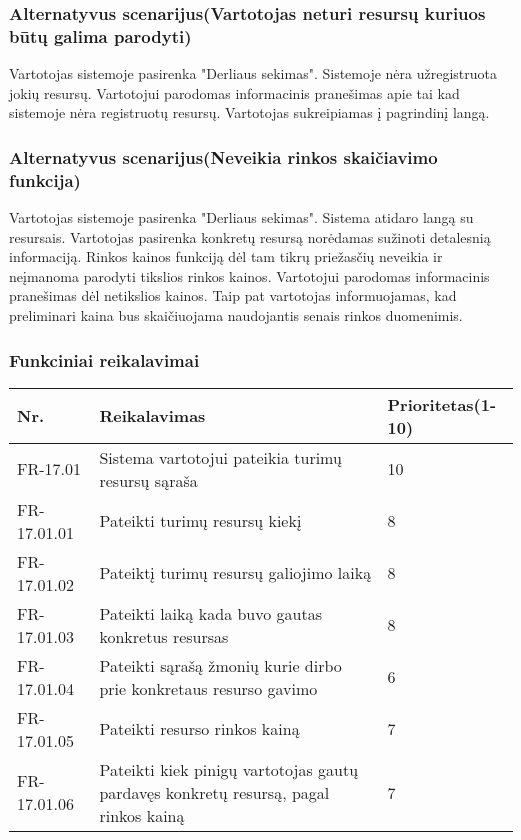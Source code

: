 \documentclass[oneside]{VUMIFPSkursinis}
\begin{document}
	\subsubsection{Alternatyvus scenarijus(Vartotojas neturi resursų kuriuos būtų galima parodyti)}
	Vartotojas sistemoje pasirenka "Derliaus  sekimas". Sistemoje nėra užregistruota jokių resursų. Vartotojui parodomas informacinis pranešimas apie tai kad sistemoje nėra registruotų resursų. Vartotojas sukreipiamas į pagrindinį langą.
	\subsubsection{Alternatyvus scenarijus(Neveikia rinkos skaičiavimo funkcija)}
	Vartotojas sistemoje pasirenka "Derliaus sekimas". Sistema atidaro langą su resursais. Vartotojas pasirenka konkretų resursą norėdamas sužinoti detalesnią informaciją. Rinkos kainos funkciją dėl tam tikrų priežasčių neveikia ir neįmanoma parodyti tikslios rinkos kainos. Vartotojui parodomas informacinis pranešimas dėl netikslios kainos. Taip pat vartotojas informuojamas, kad preliminari kaina bus skaičiuojama naudojantis senais rinkos duomenimis.
	\subsubsection{Funkciniai reikalavimai}
\begin{table}[htbp]
	\begin{tabularx}{1\textwidth}{ |P{2.5cm}|X|P{3cm }| }  \hline
		Nr. & Reikalavimas & Prioritetas(1-10) \\ \hline
		FR-17.01 & Sistema vartotojui pateikia turimų resursų sąraša & 10 \\ \hline
		FR-17.01.01 & Pateikti turimų resursų kiekį & 8 \\ \hline
		FR-17.01.02 & Pateiktį turimų resursų galiojimo laiką & 8 \\ \hline
		FR-17.01.03 & Pateikti laiką kada buvo gautas konkretus resursas & 8 \\ \hline
		FR-17.01.04 & Pateikti sąrašą žmonių kurie dirbo prie konkretaus resurso gavimo & 6 \\ \hline
		FR-17.01.05 & Pateikti resurso rinkos kainą & 7 \\ \hline 
		FR-17.01.06 & Pateikti kiek pinigų vartotojas gautų pardavęs konkretų resursą, pagal rinkos kainą & 7 \\ \hline
	\end{tabularx}
\end{table}	
	
\end{document}
